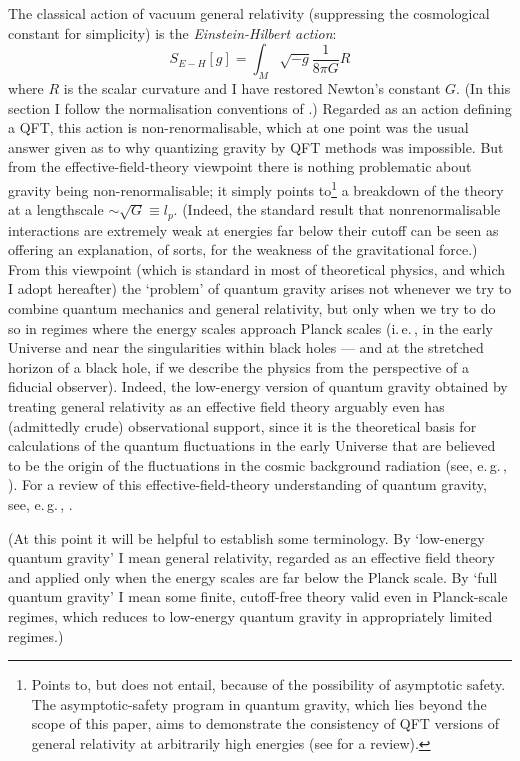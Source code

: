 \documentclass[12pt]{article}
\newcommand{\iec}{\mbox{i.\,e.\,}}
\newcommand{\egc}{\mbox{e.\,g.\,}}
\newcommand{\be}{\begin{equation}}
\newcommand{\ee}{\end{equation}}
\begin{document}
The classical action of vacuum general relativity (suppressing the cosmological constant for simplicity) is the \emph{Einstein-Hilbert action}:
\be
S_{E-H}[g]=\int_M \sqrt{-g} \frac{1}{8\pi G}  R 
\ee
where $R$ is the scalar curvature and I have restored Newton's constant $G$. (In this section I follow the normalisation conventions of .) Regarded as an action defining a QFT, this action is non-renormalisable, which at one point was the usual answer given as to why quantizing gravity by QFT methods was impossible. But from the effective-field-theory viewpoint there is nothing problematic about gravity being non-renormalisable; it simply points to\footnote{Points to, but does not entail, because of the possibility of asymptotic safety. The asymptotic-safety program in quantum gravity, which lies beyond the scope of this paper, aims to demonstrate the consistency of QFT versions of general relativity at arbitrarily high energies (see  for a review).} a breakdown of the theory at a lengthscale $\sim \sqrt{G}\equiv l_p$. (Indeed, the standard result that nonrenormalisable interactions are extremely weak at energies far below their cutoff can be seen as offering an explanation, of sorts, for the weakness of the gravitational force.) From this viewpoint (which is standard in most of theoretical physics, and which I adopt hereafter) the `problem' of quantum gravity arises not whenever we try to combine quantum mechanics and general relativity, but only when we try to do so in regimes where the energy scales approach Planck scales (\iec, in the early Universe and near the singularities within black holes --- and at the stretched horizon of a black hole, if we describe the physics from the perspective of a fiducial observer). Indeed, the low-energy version of quantum gravity obtained by treating general relativity as an effective field theory arguably even has (admittedly crude) observational support, since it is the theoretical basis for  calculations of the quantum fluctuations in the early Universe that are believed to be the origin of the fluctuations in the cosmic background radiation (see, \egc, ). For a review of this effective-field-theory understanding of quantum gravity, see, \egc, .

(At this point it will be helpful to establish some terminology.  By `low-energy quantum gravity' I mean general relativity, regarded as an effective field theory and applied only when the energy scales are far below the Planck scale. By `full quantum gravity' I mean some finite, cutoff-free theory valid even in Planck-scale regimes, which reduces to low-energy quantum gravity in appropriately limited regimes.)
\end{document}
